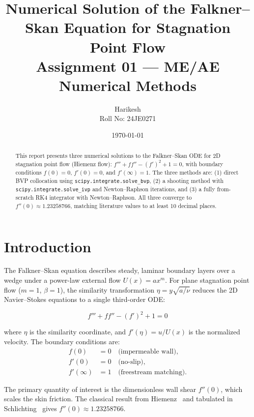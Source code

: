 \documentclass[12pt,a4paper]{article}
\title{\textbf{Numerical Solution of the Falkner--Skan Equation for Stagnation Point Flow} \\[0.5em]
\large Assignment 01 --- ME/AE Numerical Methods}
\author{Harikesh \\ Roll No: 24JE0271}
\date{\today}
\begin{document}
\maketitle

\begin{abstract}
This report presents three numerical solutions to the Falkner--Skan ODE for 2D stagnation point flow (Hiemenz flow): $f''' + ff'' - (f')^2 + 1 = 0$, with boundary conditions $f(0) = 0$, $f'(0) = 0$, and $f'(\infty) = 1$. The three methods are: (1) direct BVP collocation using \texttt{scipy.integrate.solve\_bvp}, (2) a shooting method with \texttt{scipy.integrate.solve\_ivp} and Newton--Raphson iterations, and (3) a fully from-scratch RK4 integrator with Newton--Raphson. All three converge to $f''(0) \approx 1.23258766$, matching literature values to at least 10 decimal places.
\end{abstract}

\section{Introduction}

The Falkner--Skan equation describes steady, laminar boundary layers over a wedge under a power-law external flow $U(x) = ax^m$. For plane stagnation point flow ($m = 1$, $\beta = 1$), the similarity transformation $\eta = y\sqrt{a/\nu}$ reduces the 2D Navier--Stokes equations to a single third-order ODE:

\begin{equation}
    f''' + f f'' - (f')^2 + 1 = 0
    \label{eq:fs}
\end{equation}

where $\eta$ is the similarity coordinate, and $f'(\eta) = u/U(x)$ is the normalized velocity. The boundary conditions are:
\begin{align}
    f(0) &= 0 \quad \text{(impermeable wall)}, \\
    f'(0) &= 0 \quad \text{(no-slip)}, \\
    f'(\infty) &= 1 \quad \text{(freestream matching)}.
\end{align}

The primary quantity of interest is the dimensionless wall shear $f''(0)$, which scales the skin friction. The classical result from Hiemenz~\cite{hiemenz1911} and tabulated in Schlichting~\cite{schlichting2016} gives $f''(0) \approx 1.23258766$.
\end{document}
